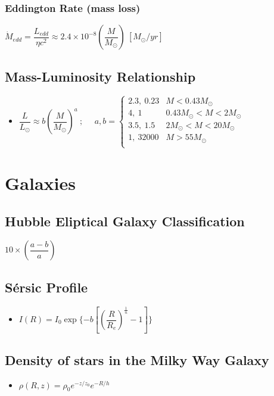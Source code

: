\subsubsection{Eddington Rate (mass loss)}
\begin{itemize}
\itemt \( \dot{M}_{edd} = \dfrac{L_{edd}}{\eta c^2} \approx 2.4 \times 10^{-8} (\dfrac{M}{M_\odot})\ [M_\odot / yr]\)
\end{itemize}

\subsection{Mass-Luminosity Relationship}
\begin{itemize}
\item \( \dfrac{L}{L_\odot} \approx b(\dfrac{M}{M_\odot})^a\ ;\ \ \ \ \ \ a, b = \begin{cases} 
      2.3,\ 0.23	& M<0.43M_\odot \\
      4,\ 1			& 0.43M_\odot < M < 2M_\odot \\
      3.5,\ 1.5 	& 2M_\odot < M < 20M_\odot \\
      1,\ 32000 	& M > 55M_\odot \\
   \end{cases}
\)
\end{itemize}


	\section{Galaxies}

\subsection{Hubble Eliptical Galaxy Classification}			
\begin{itemize}
\itemt \( 10 \times (\dfrac{a-b}{a}) \)
\end{itemize}

\subsection{S\'ersic Profile}
\begin{itemize}
\item \( I(R) = I_0 \exp\{-b[(\dfrac{R}{R_e})^\frac{1}{n}-1]\} \)
\end{itemize}

\subsection{Density of stars in the Milky Way Galaxy}
\begin{itemize}
\item \( \rho(R,z) = \rho_0 e^{-z/z_0} e^{-R/h} \)
\end{itemize}

